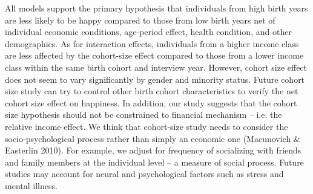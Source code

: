 All models support the primary hypothesis that individuals from high birth years are less likely to be happy compared to those from low birth years net of individual economic conditions, age-period effect, health condition, and other demographics. As for interaction effects, individuals from a higher income class are less affected by the cohort-size effect compared to those from a lower income class within the same birth cohort and interview year. However, cohort size effect does not seem to vary significantly by gender and minority status. Future cohort size study can try to control other birth cohort characteristics to verify the net cohort size effect on happiness. In addition, our study suggests that the cohort size hypothesis should not be constrained to financial mechanism – i.e. the relative income effect. We think that cohort-size study needs to consider the socio-psychological process rather than simply an economic one (Macunovich & Easterlin 2010). For example, we adjust for frequency of socializing with friends and family members at the individual level – a measure of social process. Future studies may account for neural and psychological factors such as stress and mental illness.


